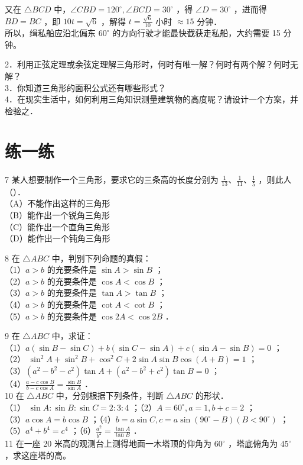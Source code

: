 \documentclass[10pt]{article}
\begin{document}
又在 \(\triangle B C D\) 中，\(\angle C B D=120^{\circ}, \angle B C D=30^{\circ}\) ，得 \(\angle D=30^{\circ}\) ，进而得 \(B D=B C\) ，即 \(10 t=\sqrt{6}\) ，解得 \(t=\frac{\sqrt{6}}{10}\) 小时 \(\approx 15\) 分钟．\\
所以，缉私船应沿北偏东 \(60^{\circ}\) 的方向行驶才能最快截获走私船，大约需要 15 分钟。

2．利用正弦定理或余弦定理解三角形时，何时有唯一解？何时有两个解？何时无解？\\
3．你知道三角形的面积公式还有哪些形式？\\
4．在现实生活中，如何利用三角知识测量建筑物的高度呢？请设计一个方案，并检验之．

\section*{练一练}
7 某人想要制作一个三角形，要求它的三条高的长度分别为 \(\frac{1}{13} 、 \frac{1}{11} 、 \frac{1}{5}\) ，则此人（）．\\
（A）不能作出这样的三角形\\
（B）能作出一个锐角三角形\\
（C）能作出一个直角三角形\\
（D）能作出一个钝角三角形

8 在 \(\triangle A B C\) 中，判别下列命题的真假：\\
（1）\(a>b\) 的充要条件是 \(\sin A>\sin B\) ；\\
（2）\(a>b\) 的充要条件是 \(\cos A<\cos B\) ；\\
（3）\(a>b\) 的充要条件是 \(\tan A>\tan B\) ；\\
（4）\(a>b\) 的充要条件是 \(\cot A<\cot B\) ；\\
（5）\(a>b\) 的充要条件是 \(\cos 2 A<\cos 2 B\) ．

9 在 \(\triangle A B C\) 中，求证：\\
（1）\(a(\sin B-\sin C)+b(\sin C-\sin A)+c(\sin A-\sin B)=0\) ；\\
（2） \(\sin ^{2} A+\sin ^{2} B+\cos ^{2} C+2 \sin A \sin B \cos (A+B)=1\) ；\\
（3）\(\left(a^{2}-b^{2}-c^{2}\right) \tan A+\left(a^{2}-b^{2}+c^{2}\right) \tan B=0\) ；\\
（4）\(\frac{a-c \cos B}{b-c \cos A}=\frac{\sin B}{\sin A}\) ．\\
10 在 \(\triangle A B C\) 中，分别根据下列条件，判断 \(\triangle A B C\) 的形状．\\
（1） \(\sin A: \sin B: \sin C=2: 3: 4\) ；（2）\(A=60^{\circ}, a=1, b+c=2\) ；\\
（3）\(a \cos A=b \cos B\) ；（4）\(b=a \sin C, c=a \sin \left(90^{\circ}-B\right)\left(B<90^{\circ}\right)\) ；\\
（5）\(a^{4}+b^{4}=c^{4}\) ；（6）\(\frac{a^{2}}{b^{2}}=\frac{\tan A}{\tan B}\) ．\\
11 在一座 20 米高的观测台上测得地面一木塔顶的仰角为 \(60^{\circ}\) ，塔底俯角为 \(45^{\circ}\) ，求这座塔的高。
\end{document}

